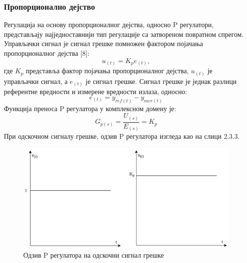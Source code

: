 \documentclass[12pt]{article}
\begin{document}
\subsubsection{Пропорционално дејство}
Регулација на основу пропорционалног дејства, односно P регулатори, представљају најједноставнији тип регулације са затвореном повратном спрегом. Управљачки сигнал је сигнал грешке помножен фактором појачања пропорционалног дејства [8]:
\begin{equation}
    u_{(t)} = K_p e_{(t)},
\end{equation}
где $K_p$ представља фактор појачања пропорционалног дејства, $u_{(t)}$ је управљачки сигнал, а $e_{(t)}$ је сигнал грешке. Сигнал грешке је једнак разлици референтне вредности и измерене вредности излаза, односно:
\begin{equation}
    e_{(t)}=y_{ref(t)} - y_{mer(t)}
\end{equation}
Функција преноса P регулатора у комплексном домену је:
\begin{equation}
    G_{p(s)} = \dfrac{U_{(s)}}{E_{(s)}} = K_p
\end{equation}
При одскочном сигналу грешке, одзив P регулатора изгледа као на слици 2.3.3.
\begin{figure}[H]
    \centering
    \includegraphics[width=13cm]{figures/p.drawio.png}
    \caption{Одзив P регулатора на одскочни сигнал грешке}
    \label{fig:P_одзив}
\end{figure}
\end{document}
